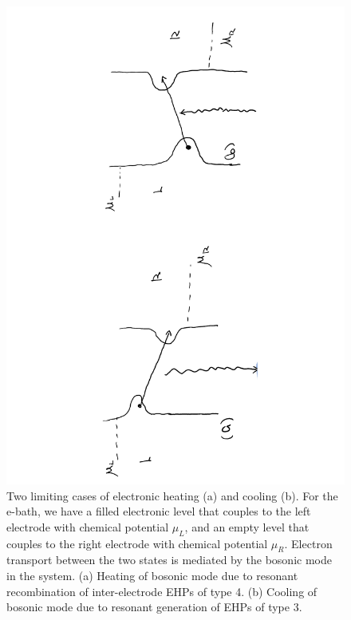 \documentclass[aps
,twocolumn
,floatfix,footinbib,prl,longbibliography
]{revtex4-1}
\begin{document}
\begin{figure}[h]
	\includegraphics[scale=0.3,angle=-90]{heating-cooling-v3.pdf}
	\caption{Two limiting cases of electronic heating (a) and cooling (b). For the e-bath, we have a filled electronic level that couples to the left electrode with chemical potential $\mu_L$, and an empty level that couples to the right electrode with chemical potential $\mu_R$. Electron transport between the two states is mediated by the bosonic mode in the system.  (a) Heating of bosonic mode due to resonant recombination of inter-electrode EHPs of type 4. (b) Cooling of bosonic mode due to resonant generation of EHPs of type 3.}
	\label{fig:resonant}
\end{figure}
\end{document}

